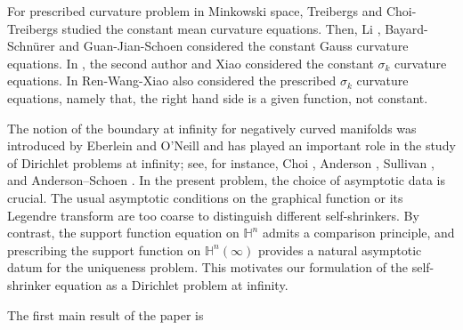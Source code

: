 \documentclass[reqno]{amsart}
\theoremstyle{remark}
\theoremstyle{definition}
\numberwithin{equation}{section}
\begin{document}
For prescribed curvature problem in Minkowski space, Treibergs \cite{Treibergs1982} and Choi-Treibergs \cite{ChoiTreibergs1990} studied the constant mean curvature equations. Then, Li \cite{Li1995}, Bayard-Schn\"urer \cite{BayardSchnürer} and Guan-Jian-Schoen \cite{GJS2006} considered the constant Gauss curvature equations. In 
\cite{Entireconstantsigmak,WX21}, the second author and Xiao considered the constant $\sigma_k$ curvature equations.  
In \cite{Theprescribedcurvatureproblem} Ren-Wang-Xiao also considered the prescribed $\sigma_k$ curvature equations, namely that, the right hand side is a given function, not constant.     


The notion of the boundary at infinity for negatively curved manifolds was introduced by Eberlein and O'Neill \cite{Visibilitymanifolds} and has played an important role in the study of Dirichlet problems at infinity; see, for instance, Choi \cite{Choi}, Anderson \cite{Anderson}, Sullivan \cite{sullivan1983dirichlet}, and Anderson--Schoen \cite{AndersonSchoen}. In the present problem, the choice of asymptotic data is crucial. The usual asymptotic conditions on the graphical function or its Legendre transform are too coarse to distinguish different self-shrinkers. By contrast, the support function equation on $\mathbb{H}^n$ admits a comparison principle, and prescribing the support function on $\mathbb{H}^n(\infty)$ provides a natural asymptotic datum for the uniqueness problem. This motivates our formulation of the self-shrinker equation as a Dirichlet problem at infinity.


The first main result of the paper is

\end{document}
